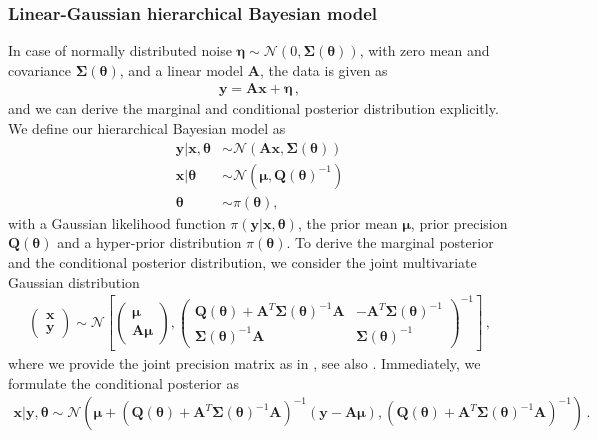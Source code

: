 \subsubsection{Linear-Gaussian hierarchical Bayesian model}
In case of normally distributed noise $\bm{\eta} \sim \mathcal{N}(0,\bm{\Sigma}(\bm{\theta}))$, with zero mean and covariance $\bm{\Sigma}(\bm{\theta})$, and a linear model $\bm{A}$, the data is given as 
\begin{align}
	\bm{y} = \bm{A} \bm{x} + \bm{\eta} \, ,
	\label{eq:LinDat}
\end{align}
and we can derive the marginal and conditional posterior distribution explicitly.
We define our hierarchical Bayesian model as
\begin{subequations}
	\begin{align}
		\bm{y} |  \bm{x}, \bm{\theta} &\sim \mathcal{N}(\bm{A} \bm{x}, \bm{\Sigma}(\bm{\theta}) ) \\
		\bm{x} |  \bm{\theta} &\sim \mathcal{N}(\bm{\mu}, \bm{Q}(\bm{\theta})^{-1} ) \\
		\bm{\theta} &\sim \pi(\bm{\theta}) ,
	\end{align}
	\label{eq:GenBayMode}
\end{subequations}
with a Gaussian likelihood function $\pi(\bm{y} |  \bm{x}, \bm{\theta} )$, the prior mean $\bm{\mu}$, prior precision $\bm{Q}(\bm{\theta})$ and a hyper-prior distribution $\pi(\bm{\theta})$.
To derive the marginal posterior and the conditional posterior distribution, we consider the joint multivariate Gaussian distribution
\begin{align}
	\begin{pmatrix}
		\bm{x} \\
		\bm{y}
	\end{pmatrix}\sim \mathcal{N}\left[  \begin{pmatrix}
		\bm{\mu} \\
		\bm{A}\bm{\mu}
	\end{pmatrix},\begin{pmatrix}
		\bm{Q}(\bm{\theta}) + \bm{A}^T \bm{\Sigma}(\bm{\theta})^{-1} \bm{A} & - \bm{A}^T \bm{\Sigma}(\bm{\theta})^{-1} \\
		\bm{\Sigma}(\bm{\theta})^{-1} \bm{A} & \bm{\Sigma}(\bm{\theta})^{-1} 
	\end{pmatrix}^{-1} \right] \, ,
\end{align}
where we provide the joint precision matrix as in \cite{SIMPSON201216}, see also \cite{rue2005gaussian}.
Immediately, we formulate the conditional posterior as 
\begin{align}
	\bm{x} | \bm{y}, \bm{\theta} \sim \mathcal{N}(\bm{\mu} + (\bm{Q}(\bm{\theta}) + \bm{A}^T \bm{\Sigma}(\bm{\theta})^{-1} \bm{A})^{-1}(\bm{y} - \bm{A}\bm{\mu}),(\bm{Q}(\bm{\theta}) + \bm{A}^T \bm{\Sigma}(\bm{\theta})^{-1} \bm{A})^{-1}) \, .
\end{align}
